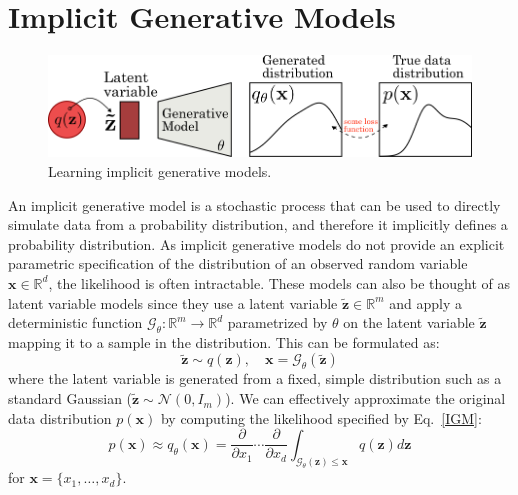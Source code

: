 \section{Implicit Generative Models}\label{ImplicitGen}
\begin{figure}[htb]
  \begin{center}
  \includegraphics[width=\linewidth]{figures/implicitgen.png}
  \end{center}
  \caption{Learning implicit generative models.}\label{fig:implicit_gen}
\end{figure}
An implicit generative model is a stochastic process that can be used to directly simulate data from a probability distribution, and therefore it implicitly defines a probability distribution. As implicit generative models do not provide an explicit parametric specification of the
distribution of an observed random variable $\mathbf{x}\in \mathbb{R}^d$, the likelihood is often intractable. These models can also be thought of as latent variable models since they use a latent variable $\mathbf{\tilde{z}} \in \mathbb{R}^m$ and apply a deterministic function $\mathcal{G}_\theta: \mathbb{R}^m\rightarrow \mathbb{R}^d$ parametrized by $\theta$ on the latent variable $\mathbf{\tilde{z}}$ mapping it to a sample in the distribution. This can be formulated as:
\begin{equation}\label{IGM}
    \mathbf{\tilde{z}} \sim q(\mathbf{z}), \quad \mathbf{x} =  \mathcal{G}_\theta(\mathbf{\tilde{z}})
\end{equation}
where the latent variable is generated from a fixed, simple distribution such as a standard Gaussian ($\mathbf{\tilde{z}} \sim \mathcal{N}\left(0, I_m\right)$). We can effectively approximate the original data distribution $p(\mathbf{x})$ by computing the likelihood specified by Eq.~\ref{IGM}:
\begin{equation}\label{IGMLikelihood}
    p(\mathbf{x}) \approx q_\theta(\mathbf{x}) = \frac{\partial}{\partial x_1} \cdots \frac{\partial}{\partial x_d} \int_{\mathcal{G}_\theta(\mathbf{z}) \leq \mathbf{x}} q(\mathbf{z}) d\mathbf{z}
\end{equation}
for $\mathbf{x}=\{x_1, \ldots, x_d\}$. 
\\

